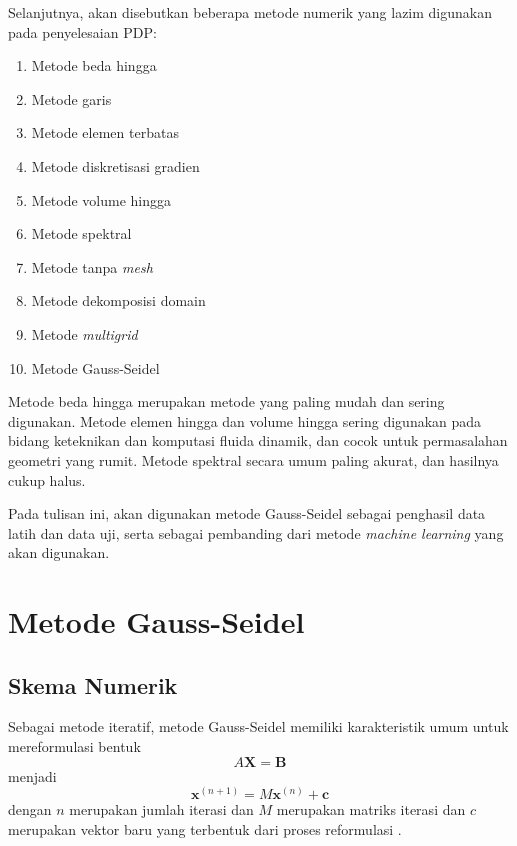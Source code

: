 Selanjutnya, akan disebutkan beberapa metode numerik yang lazim digunakan pada penyelesaian PDP:
\begin{enumerate}
    \item Metode beda hingga
    \item Metode garis
    \item Metode elemen terbatas
    \item Metode diskretisasi gradien
    \item Metode volume hingga
    \item Metode spektral
    \item Metode tanpa \emph{mesh}
    \item Metode dekomposisi domain
    \item Metode \emph{multigrid}
    \item Metode Gauss-Seidel
\end{enumerate}
Metode beda hingga merupakan metode yang paling mudah dan sering digunakan. Metode elemen hingga dan volume hingga sering digunakan pada bidang keteknikan dan komputasi fluida dinamik, dan cocok untuk permasalahan geometri yang rumit. Metode spektral secara umum paling akurat, dan hasilnya cukup halus.

Pada tulisan ini, akan digunakan metode Gauss-Seidel sebagai penghasil data latih dan data uji, serta sebagai pembanding dari metode \emph{machine learning} yang akan digunakan.

\section{Metode Gauss-Seidel}
\subsection{Skema Numerik}
Sebagai metode iteratif, metode Gauss-Seidel memiliki karakteristik umum untuk mereformulasi bentuk 
\begin{equation}\label{linear}
   A\textbf{X} = \textbf{B}
\end{equation}
 menjadi
\begin{equation}
    \textbf{x}^{(n+1)} = M\textbf{x}^{(n)} + \textbf{c}
\end{equation}
dengan $n$ merupakan jumlah iterasi dan $M$ merupakan matriks iterasi dan $c$ merupakan vektor baru yang terbentuk dari proses reformulasi \citep{Blackledge2006}.

